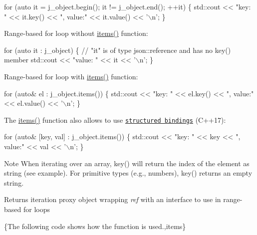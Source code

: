 \begin{DoxyCode}
\textcolor{keywordflow}{for} (\textcolor{keyword}{auto} it = j\_object.begin(); it != j\_object.end(); ++it)
\{
    std::cout << \textcolor{stringliteral}{"key: "} << it.key() << \textcolor{stringliteral}{", value:"} << it.value() << \textcolor{charliteral}{'\(\backslash\)n'};
\}
\end{DoxyCode}


Range-\/based for loop without {\ttfamily \hyperlink{classnlohmann_1_1basic__json_afe3e137ace692efa08590d8df40f58dd}{items()}} function\+:


\begin{DoxyCode}
\textcolor{keywordflow}{for} (\textcolor{keyword}{auto} it : j\_object)
\{
    \textcolor{comment}{// "it" is of type json::reference and has no key() member}
    std::cout << \textcolor{stringliteral}{"value: "} << it << \textcolor{charliteral}{'\(\backslash\)n'};
\}
\end{DoxyCode}


Range-\/based for loop with {\ttfamily \hyperlink{classnlohmann_1_1basic__json_afe3e137ace692efa08590d8df40f58dd}{items()}} function\+:


\begin{DoxyCode}
\textcolor{keywordflow}{for} (\textcolor{keyword}{auto}& el : j\_object.items())
\{
    std::cout << \textcolor{stringliteral}{"key: "} << el.key() << \textcolor{stringliteral}{", value:"} << el.value() << \textcolor{charliteral}{'\(\backslash\)n'};
\}
\end{DoxyCode}


The {\ttfamily \hyperlink{classnlohmann_1_1basic__json_afe3e137ace692efa08590d8df40f58dd}{items()}} function also allows to use \href{https://en.cppreference.com/w/cpp/language/structured_binding}{\tt structured bindings} (C++17)\+:


\begin{DoxyCode}
\textcolor{keywordflow}{for} (\textcolor{keyword}{auto}& [key, val] : j\_object.items())
\{
    std::cout << \textcolor{stringliteral}{"key: "} << key << \textcolor{stringliteral}{", value:"} << val << \textcolor{charliteral}{'\(\backslash\)n'};
\}
\end{DoxyCode}


\begin{DoxyNote}{Note}
When iterating over an array, {\ttfamily key()} will return the index of the element as string (see example). For primitive types (e.\+g., numbers), {\ttfamily key()} returns an empty string.
\end{DoxyNote}
\begin{DoxyReturn}{Returns}
iteration proxy object wrapping {\itshape ref} with an interface to use in range-\/based for loops
\end{DoxyReturn}
\{The following code shows how the function is used.,items\}

